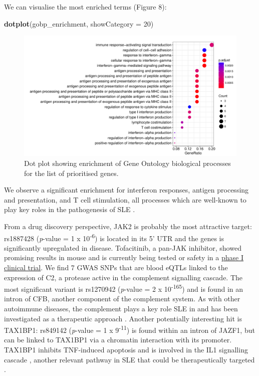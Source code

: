 \documentclass[9pt,a4paper,]{extarticle}
\newenvironment{Shaded}{\begin{snugshade}}{\end{snugshade}}
\newcommand{\KeywordTok}[1]{\textcolor[rgb]{0.13,0.29,0.53}{\textbf{#1}}}
\newcommand{\DataTypeTok}[1]{\textcolor[rgb]{0.13,0.29,0.53}{#1}}
\newcommand{\DecValTok}[1]{\textcolor[rgb]{0.00,0.00,0.81}{#1}}
\newcommand{\NormalTok}[1]{#1}
\theoremstyle{definition}
\theoremstyle{definition}
\theoremstyle{definition}
\theoremstyle{remark}
\begin{document}
We can visualise the most enriched terms (Figure 8):

\begin{Shaded}
\begin{Highlighting}[]
\KeywordTok{dotplot}\NormalTok{(gobp_enrichment, }\DataTypeTok{showCategory =} \DecValTok{20}\NormalTok{)}
\end{Highlighting}
\end{Shaded}

\begin{figure}

{\centering \includegraphics{biocondutor-regulatory-genomics-workflow_files/figure-latex/figure8-1} 

}

\caption{Dot plot showing enrichment of Gene Ontology biological processes for the list of prioritised genes.}\label{fig:figure8}
\end{figure}

We observe a significant enrichment for interferon responses, antigen processing and presentation, and T cell stimulation, all processes which are well-known to play key roles in the pathogenesis of SLE \citep{Oon2016, Morris2014, Suarez-Fueyo2016}.

From a drug discovery perspective, JAK2 is probably the most attractive target: rs1887428 (\emph{p}-value = 1 x 10\textsuperscript{-6}) is located in its 5' UTR and the genes is significantly upregulated in disease.
Tofacitinib, a pan-JAK inhibitor, showed promising results in mouse \citep{Furumoto2017} and is currently being tested or safety in a \href{https://clinicaltrials.gov/ct2/show/NCT02535689}{phase I clinical trial}.
We find 7 GWAS SNPs that are blood eQTLs linked to the expression of C2, a protease active in the complement signalling cascade.
The most significant variant is rs1270942 (\emph{p}-value = 2 x 10\textsuperscript{-165}) and is found in an intron of CFB, another component of the complement system.
As with other autoimmune diseases, the complement plays a key role SLE in and has been investigated as a therapeutic approach \citep{Leffler2014}.
Another potentially interesting hit is TAX1BP1: rs849142 (\emph{p}-value = 1 x 9\textsuperscript{-11}) is found within an intron of JAZF1, but can be linked to TAX1BP1 via a chromatin interaction with its promoter.
TAX1BP1 inhibits TNF-induced apoptosis \citep{DeValck1999} and is involved in the IL1 signalling cascade \citep{Ling2000}, another relevant pathway in SLE that could be therapeutically targeted \citep{Ronnblom2010}.
\end{document}
